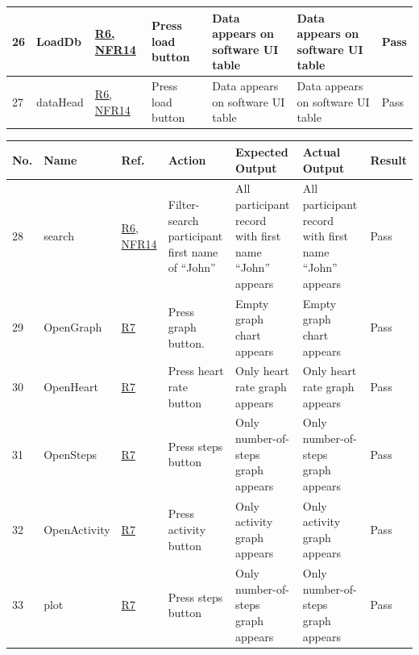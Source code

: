 \documentclass[12pt, titlepage]{article}
\begin{document}
\begin{center}
\begin{table} [H]
\begin{tabular}{ | p{0.5cm} | p{2.8cm} |  p{1.1cm} | p{2.7cm} | p{2.7cm} | p{2.7cm} | p{1.1cm} |}
\hline
26 & LoadDb & \href{https://github.com/zakerl/Capstone_Project/blob/main/docs/SRS/SRS.pdf}{R6, NFR14} & Press load button & Data appears on software UI table &  Data appears on software UI table & Pass \\ 
\hline
27 & dataHead & \href{https://github.com/zakerl/Capstone_Project/blob/main/docs/SRS/SRS.pdf}{R6, NFR14} & Press load button & Data appears on software UI table & Data appears on software UI table & Pass \\ 
\hline
\end{tabular}
\end{table}
\end{center}

\begin{center}
\begin{table} [H]
\begin{tabular}{ | p{0.5cm} | p{2.8cm} |  p{1.1cm} | p{2.7cm} | p{2.7cm} | p{2.7cm} | p{1.1cm} |}
\hline
\textbf{No.} & \textbf{Name}  & \textbf{Ref.} & \textbf{Action} & \textbf{Expected Output} & \textbf{Actual \newline Output} & \textbf{Result} \\
\hline
28 & search & \href{https://github.com/zakerl/Capstone_Project/blob/main/docs/SRS/SRS.pdf}{R6, NFR14} & Filter-search participant first name of “John” & All participant record with first name “John” appears & All participant record with first name “John” appears & Pass \\ 
\hline
29 & OpenGraph & \href{https://github.com/zakerl/Capstone_Project/blob/main/docs/SRS/SRS.pdf}{R7} & Press graph button. & Empty graph chart appears & Empty graph chart appears & Pass \\ 
\hline
30 & OpenHeart & \href{https://github.com/zakerl/Capstone_Project/blob/main/docs/SRS/SRS.pdf}{R7} & Press heart rate button & Only heart rate graph appears & Only heart rate graph appears & Pass \\ 
\hline
31 & OpenSteps & \href{https://github.com/zakerl/Capstone_Project/blob/main/docs/SRS/SRS.pdf}{R7} & Press steps button& Only number-of-steps graph appears & Only number-of-steps graph appears & Pass \\ 
\hline
32 & OpenActivity & \href{https://github.com/zakerl/Capstone_Project/blob/main/docs/SRS/SRS.pdf}{R7} & Press activity button & Only activity graph appears & Only activity graph appears & Pass \\ 
\hline
33 & plot & \href{https://github.com/zakerl/Capstone_Project/blob/main/docs/SRS/SRS.pdf}{R7} & Press steps button & Only number-of-steps graph appears & Only number-of-steps graph appears & Pass \\ 

\end{tabular}
\end{table}
\end{center}
\end{document}
